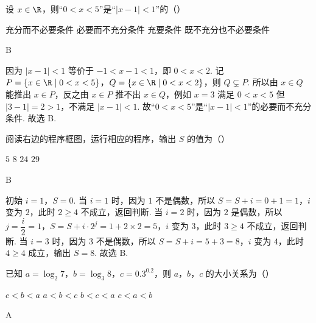 \begin{problem}
设 \(x\in\R\)，则“\(0<x<5\)”是“\(|x-1|<1\)”的（\quad）

\choices
    {充分而不必要条件}
    {必要而不充分条件}
    {充要条件}
    {既不充分也不必要条件}
\end{problem}

\begin{answer}
B
\end{answer}

\begin{solution}
因为 \(\left|x-1\right|<1\) 等价于 \(-1<x-1<1\)，即 \(0<x<2\). 记 \(P=\{x\in\R\mid 0<x<5\}\)，\(Q=\{x\in\R\mid 0<x<2\}\)，则 \(Q\subsetneq P\). 所以由 \(x\in Q\) 能推出 \(x\in P\)，反之由 \(x\in P\) 推不出 \(x\in Q\)，例如 \(x=3\) 满足 \(0<x<5\) 但 \(\left|3-1\right|=2>1\)，不满足 \(\left|x-1\right|<1\). 故“\(0<x<5\)”是“\(\left|x-1\right|<1\)”的必要而不充分条件. 故选 B.
\end{solution}

\begin{problem}
阅读右边的程序框图，运行相应的程序，输出 \(S\) 的值为（\quad）


\choices
    {\(5\)}
    {\(8\)}
    {\(24\)}
    {\(29\)}
\end{problem}

\begin{answer}
B
\end{answer}

\begin{solution}
初始 \(i=1\)，\(S=0\). 当 \(i=1\) 时，因为 \(1\) 不是偶数，所以 \(S=S+i=0+1=1\)，\(i\) 变为 \(2\)，此时 \(2\ge 4\) 不成立，返回判断. 当 \(i=2\) 时，因为 \(2\) 是偶数，所以 \(j=\dfrac{i}{2}=1\)，\(S=S+i\cdot 2^{j}=1+2\times 2=5\)，\(i\) 变为 \(3\)，此时 \(3\ge 4\) 不成立，返回判断. 当 \(i=3\) 时，因为 \(3\) 不是偶数，所以 \(S=S+i=5+3=8\)，\(i\) 变为 \(4\)，此时 \(4\ge 4\) 成立，输出 \(S=8\). 故选 B.
\end{solution}

\begin{problem}
已知 \(a=\log_2 7\)，\(b=\log_3 8\)，\(c=0.3^{0.2}\)，则 \(a\)，\(b\)，\(c\) 的大小关系为（\quad）

\choices
    {\(c<b<a\)}
    {\(a<b<c\)}
    {\(b<c<a\)}
    {\(c<a<b\)}
\end{problem}

\begin{answer}
A
\end{answer}

